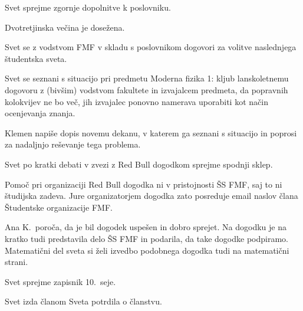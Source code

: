 \documentclass{seja}
\begin{document}
\begin{ad}
\begin{sklep*}
Svet sprejme zgornje dopolnitve k poslovniku.
\end{sklep*}
Dvotretjinska večina je dosežena.

\item Svet se z vodstvom FMF v skladu s poslovnikom dogovori za volitve
naslednjega študentska sveta.

\item Svet se seznani s situacijo pri predmetu Moderna fizika 1: kljub
lanskoletnemu dogovoru z (bivšim) vodstvom fakultete in izvajalcem predmeta, da
popravnih kolokvijev ne bo več, jih izvajalec ponovno namerava uporabiti kot
način ocenjevanja znanja.

\begin{sklep*}
Klemen napiše dopis novemu dekanu, v katerem ga seznani s situacijo in poprosi
za nadaljnjo reševanje tega problema.
\end{sklep*}

\item Svet po kratki debati v zvezi z Red Bull dogodkom sprejme spodnji sklep.
\begin{sklep*}
Pomoč pri organizaciji Red Bull dogodka ni v pristojnosti ŠS FMF, saj to ni
študijska zadeva. Jure organizatorjem dogodka zato posreduje email naslov člana
Študentske organizacije FMF.
\end{sklep*}

\item Ana K.~poroča, da je bil dogodek uspešen in dobro sprejet. Na dogodku je
na kratko tudi predstavila delo ŠS FMF in podarila, da take dogodke podpiramo.
Matematični del sveta si želi izvedbo podobnega dogodka tudi na matematični
strani.

\item
\begin{sklep*}
Svet sprejme zapisnik 10.~seje.
\end{sklep*}

\begin{sklep*}
  Svet izda članom Sveta potrdila o članstvu.
\end{sklep*}
\end{ad}

\makeatletter \global\let\@enddocumenthook\@empty \makeatother
{}
\end{document}

